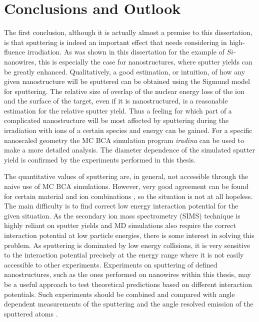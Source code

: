 \chapter{Conclusions and Outlook}

The first conclusion, although it is actually almost a premise to this dissertation, is that sputtering is indeed an important effect that needs considering in high-fluence irradiation. As was shown in this dissertation for the example of $Si$-nanowires, this is especially the case for nanostructures, where sputter yields can be greatly enhanced. Qualitatively, a good estimation, or intuition, of how any given nanostructure will be sputtered can be obtained using the Sigmund model for sputtering. The relative size of overlap of the nuclear energy loss of the ion and the surface of the target, even if it is nanostructured, is a reasonable estimation for the relative sputter yield. Thus a feeling for which part of a complicated nanostructure will be most affected by sputtering during the irradiation with ions of a certain species and energy can be gained. For a specific nanoscaled geometry the MC BCA simulation program \emph{iradina} \cite{borschel_ion_2011} can be used to make a more detailed analysis. The diameter dependence of the simulated sputter yield is confirmed by the experiments performed in this thesis.

The quantitative values of sputtering are, in general, not accessible through the naive use of MC BCA simulations. However, very good agreement can be found for certain material and ion combinations \cite{biersack_computer_1987,hofsass_simulation_2014}, so the situation is not at all hopeless. The main difficulty is to find correct low energy interaction potential for the given situation. As the secondary ion mass spectrometry (SIMS) technique is highly reliant on sputter yields and MD simulations also require the correct interaction potential at low particle energies, there is some interest in solving this problem.  As sputtering is dominated by low energy collisions, it is very sensitive to the interaction potential precisely at the energy range where it is not easily accessible to other experiments. Experiments on sputtering of defined nanostructures, such as the ones performed on nanowires within this thesis, may be a useful approach to test theoretical predictions based on different interaction potentials. Such experiments should be combined and compared with angle dependent measurements of the sputtering \cite{hofsass_simulation_2014} and the angle resolved emission of the sputtered atoms \cite{wirtz_storing_2008,verdeil_angular_2008}.

